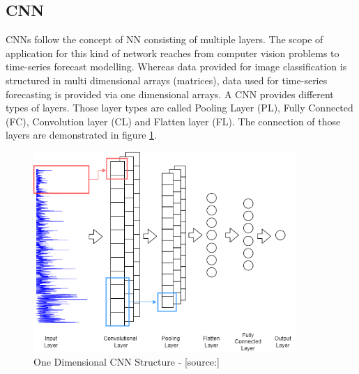 \subsection{CNN}
\label{sec:cnn}
CNNs follow the concept of NN consisting of multiple layers. The scope of application for this kind of network reaches from computer vision problems to time-series forecast modelling. Whereas data provided for image classification is structured in multi dimensional arrays (matrices), data used for time-series forecasting is provided via one dimensional arrays.\cite{cnn_intro} A CNN provides different types of layers. Those layer types are called Pooling Layer (PL), Fully Connected (FC), Convolution layer (CL) and Flatten layer (FL). The connection of those layers are demonstrated in figure \ref{fig:cnn_struct}.
\begin{figure}[H]
	\centering
		\includegraphics[width=10cm]{images/1d_cnn_model}
	\caption{One Dimensional CNN Structure - [source:\cite{cnn_vechicle}]}
	\label{fig:cnn_struct}
\end{figure}

